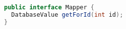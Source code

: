 
\begin{lstlisting}[language=Java, caption={MyBatis Mapper interface using XML mapper file}, label={code:mybatis:interface:xml}]
public interface Mapper {
  DatabaseValue getForId(int id);
}
\end{lstlisting}

